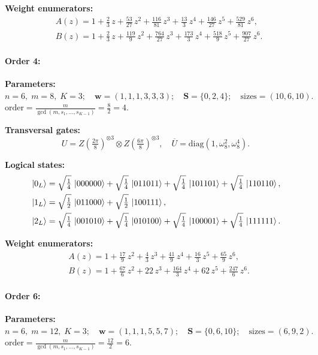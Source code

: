 \documentclass[pdflatex,sn-nature]{sn-jnl}%
\theoremstyle{thmstyleone}%
\theoremstyle{thmstyletwo}%
\theoremstyle{thmstylethree}%
\begin{document}
\begin{appendices}
\noindent\textbf{Weight enumerators:}
\begin{align*}
    &A(z) = 1 + \tfrac{2}{3}\,z + \tfrac{53}{27}\,z^{2} + \tfrac{116}{81}\,z^{3} + \tfrac{13}{3}\,z^{4} + \tfrac{146}{27}\,z^{5} + \tfrac{529}{81}\,z^{6}, \\
    &B(z) = 1 + \tfrac{2}{3}\,z + \tfrac{119}{9}\,z^{2} + \tfrac{764}{27}\,z^{3} + \tfrac{173}{3}\,z^{4} + \tfrac{518}{9}\,z^{5} + \tfrac{907}{27}\,z^{6}.
\end{align*}

\paragraph{\textbf{Order 4:}}
\noindent\textbf{Parameters:} $n=6,\; m=8,\; K=3;\quad \mathbf w=(1, 1, 1, 3, 3, 3);\quad \mathbf S=\{0, 2, 4\};\quad \text{sizes}=\left(10, 6, 10\right).$ $\displaystyle \text{order}=\frac{m}{\gcd(m,s_1,\dots,s_{K-1})}=\frac{8}{2}=4.$

\noindent\textbf{Transversal gates:}
\[
    U=Z \left(\tfrac{2\pi}{8}\right)^{\otimes3} \otimes Z \left(\tfrac{6\pi}{8}\right)^{\otimes3},\quad
    \overline U=\mathrm{diag}(1,\omega_8^{2},\omega_8^{4}).
\]

\noindent\textbf{Logical states:}
\begin{align*}
  &\ket{0_L} = \sqrt{\tfrac{1}{4}}\,\ket{000000} + \sqrt{\tfrac{1}{4}}\,\ket{011011} + \sqrt{\tfrac{1}{4}}\,\ket{101101} + \sqrt{\tfrac{1}{4}}\,\ket{110110}, \\
  &\ket{1_L} = \sqrt{\tfrac{1}{2}}\,\ket{011000} + \sqrt{\tfrac{1}{2}}\,\ket{100111}, \\
  &\ket{2_L} = \sqrt{\tfrac{1}{4}}\,\ket{001010} + \sqrt{\tfrac{1}{4}}\,\ket{010100} + \sqrt{\tfrac{1}{4}}\,\ket{100001} + \sqrt{\tfrac{1}{4}}\,\ket{111111}. 
\end{align*}

\noindent\textbf{Weight enumerators:}
\begin{align*}
    &A(z) = 1 + \tfrac{17}{9}\,z^{2} + \tfrac{4}{3}\,z^{3} + \tfrac{41}{9}\,z^{4} + \tfrac{16}{3}\,z^{5} + \tfrac{65}{9}\,z^{6}, \\
    &B(z) = 1 + \tfrac{67}{6}\,z^{2} + 22\,z^{3} + \tfrac{164}{3}\,z^{4} + 62\,z^{5} + \tfrac{247}{6}\,z^{6}.
\end{align*}

\paragraph{\textbf{Order 6:}}
\noindent\textbf{Parameters:} $n=6,\; m=12,\; K=3;\quad \mathbf w=(1, 1, 1, 5, 5, 7);\quad \mathbf S=\{0, 6, 10\};\quad \text{sizes}=\left(6, 9, 2\right).$ $\displaystyle \text{order}=\frac{m}{\gcd(m,s_1,\dots,s_{K-1})}=\frac{12}{2}=6.$


\end{appendices}
\end{document}
